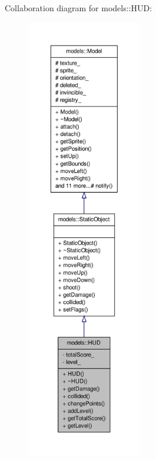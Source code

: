 \-Collaboration diagram for models\-:\-:\-H\-U\-D\-:
\nopagebreak
\begin{figure}[H]
\begin{center}
\leavevmode
\includegraphics[height=550pt]{da/df8/classmodels_1_1HUD__coll__graph}
\end{center}
\end{figure}
